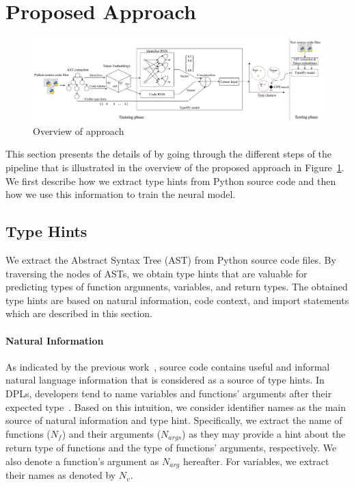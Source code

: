\newpage
\section{Proposed Approach}\label{ch4:sec:pa}

\begin{figure}[!t]
	\centering
	\includegraphics[width=\linewidth]{chapters/ch4/figs/Type4Py-Overview.pdf}
	\caption{Overview of \name approach}
	\label{ch4:fig:overview-approach}
\end{figure}

This section presents the details of \name by going through the different steps of the pipeline that is illustrated in the overview of the proposed approach in Figure~\ref{ch4:fig:overview-approach}.
We first describe how we extract type hints from Python source code and then how we use this information to train the neural model.

\subsection{Type Hints}
We extract the Abstract Syntax Tree (AST) from Python source code files. By traversing the nodes of ASTs, we obtain type hints that are valuable for predicting types of function arguments, variables, and return types. The obtained type hints are based on natural information, code context, and import statements which are described in this section.

\paragraph{Natural Information}
As indicated by the previous work~\cite{hindle2012naturalness, malik2019nl2type}, source code contains useful and informal natural language information that is considered as a source of type hints. In DPLs, developers tend to name variables and functions' arguments after their expected type~\cite{milojkovic2017exploiting}. Based on this intuition, we consider identifier names as the main source of natural information and type hint. Specifically, we extract the name of functions ($N_{f}$) and their arguments ($N_{args}$) as they may provide a hint about the return type of functions and the type of functions' arguments, respectively. We also denote a function's argument as $N_{arg}$ hereafter. For variables, we extract their names as denoted by $N_{v}$.

